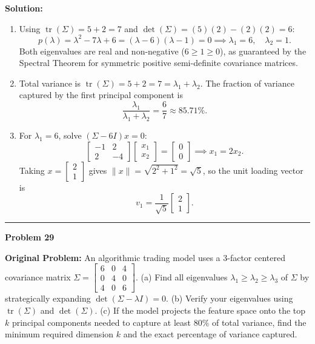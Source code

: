 \documentclass[11pt, letterpaper]{article}
\theoremstyle{definition}
\theoremstyle{remark}
\begin{document}
\textbf{Solution:}
\begin{enumerate}[label=(\alph*), topsep=3pt, itemsep=4pt]
    \item Using $\operatorname{tr}(\Sigma) = 5 + 2 = 7$ and $\det(\Sigma) = (5)(2) - (2)(2) = 6$:
    \[
    p(\lambda) = \lambda^2 - 7\lambda + 6 = (\lambda - 6)(\lambda - 1) = 0 \implies \lambda_1 = 6, \quad \lambda_2 = 1.
    \]
    Both eigenvalues are real and non-negative ($6 \ge 1 \ge 0$), as guaranteed by the Spectral Theorem for symmetric positive semi-definite covariance matrices.
    \item Total variance is $\operatorname{tr}(\Sigma) = 5 + 2 = 7 = \lambda_1 + \lambda_2$. The fraction of variance captured by the first principal component is
    \[
    \frac{\lambda_1}{\lambda_1 + \lambda_2} = \frac{6}{7} \approx 85.71\%.
    \]
    \item For $\lambda_1 = 6$, solve $(\Sigma - 6I)x = 0$:
    \[
    \begin{bmatrix} -1 & 2 \\ 2 & -4 \end{bmatrix}\begin{bmatrix} x_1 \\ x_2 \end{bmatrix} = \begin{bmatrix} 0 \\ 0 \end{bmatrix} \implies x_1 = 2x_2.
    \]
    Taking $x = \begin{bmatrix} 2 \\ 1 \end{bmatrix}$ gives $\|x\| = \sqrt{2^2 + 1^2} = \sqrt{5}$, so the unit loading vector is
    \[
    v_1 = \frac{1}{\sqrt{5}}\begin{bmatrix} 2 \\ 1 \end{bmatrix}.
    \]
\end{enumerate}

\noindent\rule{\textwidth}{0.4pt}

\noindent\textbf{Problem 29}

\textbf{Original Problem:} An algorithmic trading model uses a $3$-factor centered covariance matrix $\Sigma = \begin{bmatrix} 6 & 0 & 4 \\ 0 & 4 & 0 \\ 4 & 0 & 6 \end{bmatrix}$. (a) Find all eigenvalues $\lambda_1 \ge \lambda_2 \ge \lambda_3$ of $\Sigma$ by strategically expanding $\det(\Sigma - \lambda I) = 0$. (b) Verify your eigenvalues using $\operatorname{tr}(\Sigma)$ and $\det(\Sigma)$. (c) If the model projects the feature space onto the top $k$ principal components needed to capture at least $80\%$ of total variance, find the minimum required dimension $k$ and the exact percentage of variance captured.
\end{document}
